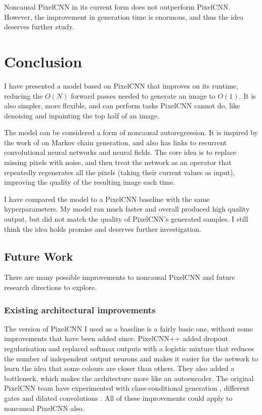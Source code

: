 \documentclass[11pt, a4paper, openany]{book}
\begin{document}
Noncausal PixelCNN in its current form does not outperform PixelCNN. However, the improvement in generation time is enormous, and thus the idea deserves further study.

\chapter{Conclusion}
\label{cha:conclusion}

I have presented a model based on PixelCNN that improves on its runtime, reducing the $O(N)$ forward passes needed to generate an image to $O(1)$. It is also simpler, more flexible, and can perform tasks PixelCNN cannot do, like denoising and inpainting the top half of an image.

The model can be considered a form of noncausal autoregression. It is inspired by the work of \citet{gsnnade} on Markov chain generation, and also has links to recurrent convolutional neural networks and neural fields. The core idea is to replace missing pixels with noise, and then treat the network as an operator that repeatedly regenerates all the pixels (taking their current values as input), improving the quality of the resulting image each time.

I have compared the model to a PixelCNN baseline with the same hyperparameters. My model ran much faster and overall produced high quality output, but did not match the quality of PixelCNN's generated samples. I still think the idea holds promise and deserves further investigation.

\section{Future Work}

There are many possible improvements to noncausal PixelCNN and future research directions to explore.

\subsection{Existing architectural improvements}

The version of PixelCNN I used as a baseline is a fairly basic one, without some improvements that have been added since. PixelCNN++ \citep{pixelcnn++} added dropout regularisation and replaced softmax outputs with a logistic mixture that reduces the number of independent output neurons and makes it easier for the network to learn the idea that some colours are closer than others. They also added a bottleneck, which makes the architecture more like an autoencoder. The original PixelCNN team have experimented with class-conditional generation \citep{pixelcnn2}, different gates \citep{videopixel} and dilated convolutions \citep{wavenet}. All of these improvements could apply to noncausal PixelCNN also.
\end{document}
